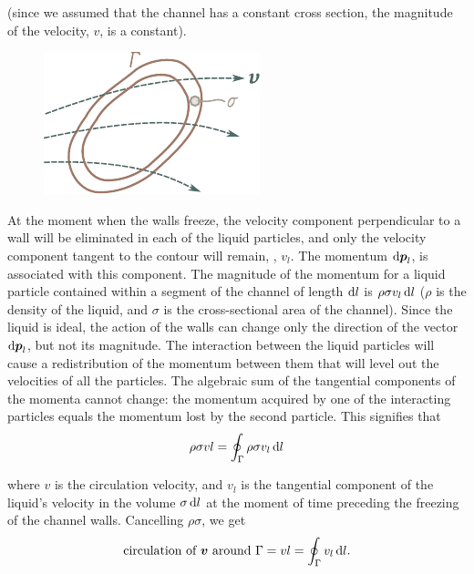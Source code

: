\noindent
(since we assumed that the channel has a constant cross section, the magnitude of the velocity, $v$, is a constant).

\begin{figure}[t]
	\begin{center}
		\includegraphics[scale=1]{figures/ch_01/fig_1_26.pdf}
		\caption[]{}
		\label{fig:1_26}
	\end{center}
	\vspace{-0.8cm}
\end{figure}

At the moment when the walls freeze, the velocity component perpendicular to a wall will be eliminated in each of the liquid particles, and only the velocity component tangent to the contour will remain, \ie, $v_l$. The momentum $\mathrm{d}\boldsymbol{p}_l$, is associated with this component. The magnitude of the momentum for a liquid particle contained within a segment of the channel of length $\mathrm{d} l$ is $\rho\sigma v_l\,\mathrm{d} l$ ($\rho$ is the density of the liquid, and $\sigma$ is the cross-sectional area of the channel). Since the liquid is ideal, the action of the walls can change only the direction of the vector $\mathrm{d}\boldsymbol{p}_l$, but not its magnitude. The interaction between the liquid particles will cause a redistribution of the momentum between them that will level out the velocities of all the particles. The algebraic sum of the tangential components of the momenta cannot change: the momentum acquired by one of the interacting particles equals the momentum lost by the second particle. This signifies that
\begin{equation*}
	\rho\sigma vl = \oint_{\Gamma} \rho \sigma v_l\,\mathrm{d} l
\end{equation*}

\noindent
where $v$ is the circulation velocity, and $v_l$ is the tangential component of the liquid's velocity in the volume $\sigma\,\mathrm{d} l$ at the moment of time preceding the freezing of the channel walls. Cancelling $\rho\sigma$, we get
\begin{equation*}
	\text{circulation of $\boldsymbol{v}$ around $\Gamma$} = vl = \oint_{\Gamma} v_l\,\mathrm{d} l.
\end{equation*}

